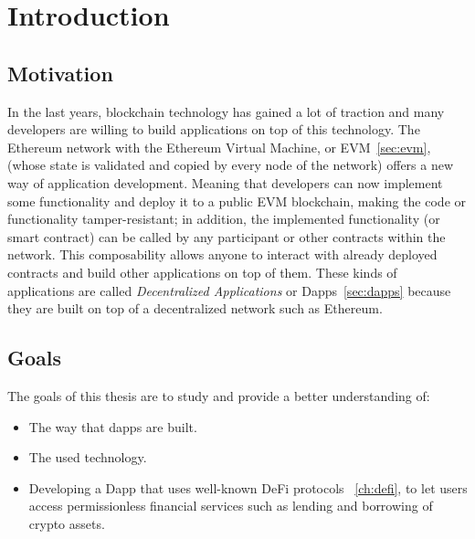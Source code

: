 \documentclass[11pt,a4paper]{report}
\begin{document}


\tableofcontents
\newpage 

\chapter{Introduction} \label{ch:intro}

\section{Motivation}
In the last years, blockchain technology has gained a lot of traction and many developers are willing to build applications on top of this technology.
The Ethereum network with the Ethereum Virtual Machine, or EVM~\ref{sec:evm}, (whose state is validated and copied by every node of the network) offers a new way of application development. Meaning that developers can now implement some functionality and deploy it to a public EVM blockchain, making the code or functionality tamper-resistant; in addition, the implemented functionality (or smart contract) can be called by any participant or other contracts within the network. This composability allows anyone to interact with already deployed contracts and build other applications on top of them. 
These kinds of applications are called \textit{Decentralized Applications} or Dapps~\ref{sec:dapps} because they are built on top of a decentralized network such as Ethereum.
\section{Goals}
The goals of this thesis are to study and provide a better understanding of:
\begin{itemize}
	\item The way that dapps are built.
	\item The used technology.
	\item Developing a Dapp that uses well-known DeFi protocols ~\ref{ch:defi}, to let users access permissionless financial services such as lending and borrowing of crypto assets.
\end{itemize}
\end{document}
